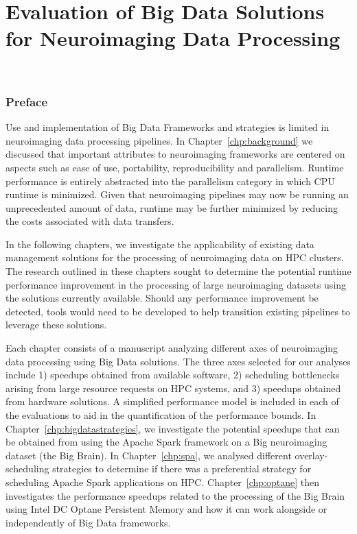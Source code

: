 \part{Evaluation of Big Data Solutions for Neuroimaging Data Processing}~\label{part:evaluation}
\section*{Preface}
Use and implementation of Big Data Frameworks and strategies is limited in
neuroimaging data processing pipelines. In Chapter~\ref{chp:background} we discussed
that important attributes to neuroimaging frameworks are centered on aspects
such as ease of use, portability, reproducibility and parallelism. Runtime performance
is entirely abstracted into the parallelism category in which CPU runtime is minimized.
Given that neuroimaging pipelines may now be running an unprecedented
amount of data, runtime may be further minimized by reducing the costs associated with data
transfers.

In the following chapters, we investigate the applicability of existing data management
solutions for the processing of neuroimaging data on HPC clusters. The research outlined
in these chapters sought to determine the potential runtime performance
improvement in the processing of large neuroimaging datasets using the solutions currently
available. Should any performance improvement be detected, tools would need to be developed
to help transition existing pipelines to leverage these solutions.

Each chapter consists of a manuscript analyzing different axes of neuroimaging data processing
using Big Data solutions. The three axes selected for our analyses include 1) speedups obtained
from available software, 2) scheduling bottlenecks arising from large resource requests on HPC systems, and
3) speedups obtained from hardware solutions. A simplified performance model is included in 
each of the evaluations to aid in the quantification of the performance bounds.
In Chapter~\ref{chp:bigdatastrategies},
we investigate the potential speedups that can be obtained from using the Apache Spark
framework on a Big neuroimaging dataset (the Big Brain). In Chapter~\ref{chp:spa}, 
we analysed different overlay-scheduling strategies to determine if there was a 
preferential strategy for scheduling Apache Spark applications on HPC. Chapter~\ref{chp:optane}
then investigates the performance speedups related to the processing of the Big Brain using
Intel DC Optane Persistent Memory and how it can work alongside or independently of Big Data
frameworks.  